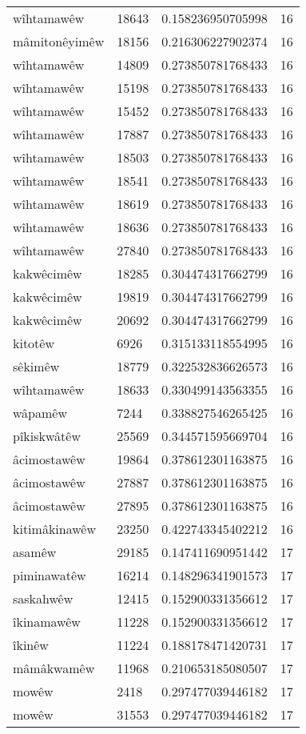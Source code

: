 \begin{longtable}{llll}
wîhtamawêw & 18643 & 0.158236950705998 & 16\\
mâmitonêyimêw & 18156 & 0.216306227902374 & 16\\
wîhtamawêw & 14809 & 0.273850781768433 & 16\\
wîhtamawêw & 15198 & 0.273850781768433 & 16\\
wîhtamawêw & 15452 & 0.273850781768433 & 16\\
wîhtamawêw & 17887 & 0.273850781768433 & 16\\
wîhtamawêw & 18503 & 0.273850781768433 & 16\\
wîhtamawêw & 18541 & 0.273850781768433 & 16\\
wîhtamawêw & 18619 & 0.273850781768433 & 16\\
wîhtamawêw & 18636 & 0.273850781768433 & 16\\
wîhtamawêw & 27840 & 0.273850781768433 & 16\\
kakwêcimêw & 18285 & 0.304474317662799 & 16\\
kakwêcimêw & 19819 & 0.304474317662799 & 16\\
kakwêcimêw & 20692 & 0.304474317662799 & 16\\
kitotêw & 6926 & 0.315133118554995 & 16\\
sêkimêw & 18779 & 0.322532836626573 & 16\\
wîhtamawêw & 18633 & 0.330499143563355 & 16\\
wâpamêw & 7244 & 0.338827546265425 & 16\\
pîkiskwâtêw & 25569 & 0.344571595669704 & 16\\
âcimostawêw & 19864 & 0.378612301163875 & 16\\
âcimostawêw & 27887 & 0.378612301163875 & 16\\
âcimostawêw & 27895 & 0.378612301163875 & 16\\
kitimâkinawêw & 23250 & 0.422743345402212 & 16\\
asamêw & 29185 & 0.147411690951442 & 17\\
piminawatêw & 16214 & 0.148296341901573 & 17\\
saskahwêw & 12415 & 0.152900331356612 & 17\\
îkinamawêw & 11228 & 0.152900331356612 & 17\\
îkinêw & 11224 & 0.188178471420731 & 17\\
mâmâkwamêw & 11968 & 0.210653185080507 & 17\\
mowêw & 2418 & 0.297477039446182 & 17\\
mowêw & 31553 & 0.297477039446182 & 17\\

\end{longtable}
